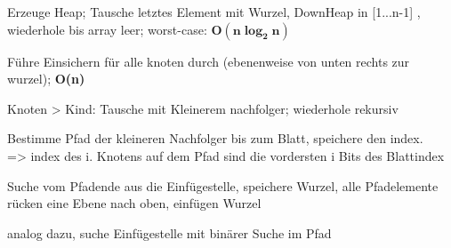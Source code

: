 Erzeuge Heap; 
Tausche letztes Element mit Wurzel, DownHeap in [1...n-1] , wiederhole bis array leer; 
worst-case: $\mathbf{O(n\log_2n)}$

Führe Einsichern für alle knoten durch (ebenenweise von unten rechts zur wurzel); \textbf{O(n)}

Knoten > Kind: Tausche mit Kleinerem nachfolger; wiederhole rekursiv

Bestimme Pfad der kleineren Nachfolger bis zum Blatt, speichere den index.\\ 
=> index des i. Knotens auf dem Pfad sind die vordersten i Bits des Blattindex

Suche vom Pfadende aus die Einfügestelle, speichere Wurzel, alle Pfadelemente rücken eine Ebene nach oben, einfügen Wurzel

 analog dazu, suche Einfügestelle mit binärer Suche im Pfad 



